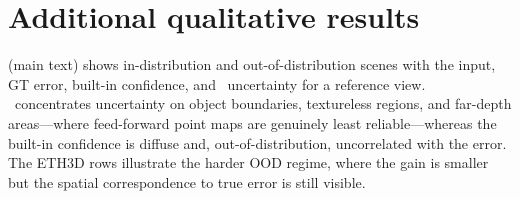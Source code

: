 \section{Additional qualitative results}
\label{app:qual}

 (main text) shows in-distribution and out-of-distribution scenes with the input, GT
error, built-in confidence, and \trustr\ uncertainty for a reference view. \trustr\ concentrates
uncertainty on object boundaries, textureless regions, and far-depth areas---where feed-forward point
maps are genuinely least reliable---whereas the built-in confidence is diffuse and, out-of-distribution,
uncorrelated with the error. The ETH3D rows illustrate the harder OOD regime, where the gain is
smaller but the spatial correspondence to true error is still visible.
